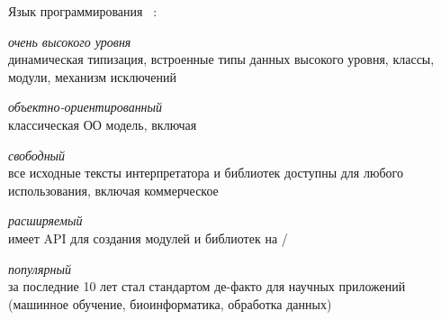 \label{py}\secdown

\clearpage\noindent
Язык программирования \py\ \cite{py}:
\begin{description}[nosep]
    \item{\emph{очень высокого уровня}}\ \\динамическая типизация, встроенные типы данных высокого уровня, классы, модули, механизм исключений
    \item{\emph{объектно-ориентированный}}\ \\классическая ОО модель, включая 
    \item{\emph{свободный}}\ \\все исходные тексты интерпретатора и библиотек доступны для любого использования, включая коммерческое
    \item{\emph{расширяемый}}\ \\имеет API для создания модулей и библиотек на \ci/\cpp
    \item{\emph{популярный}}\ \\за последние 10 лет стал стандартом де-факто для научных приложений (машинное обучение, биоинформатика,
    обработка данных)
\end{description}








\secup
